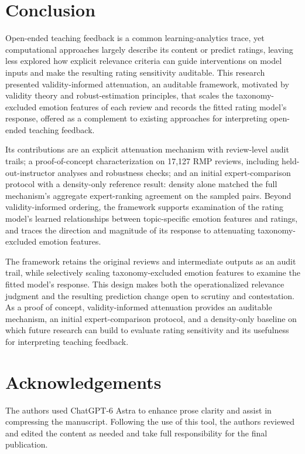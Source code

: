 \documentclass[fleqn,10pt]{JLA_article}
\begin{document}
\section{Conclusion}
Open-ended teaching feedback is a common learning-analytics trace, yet
computational approaches largely describe its content or predict ratings,
leaving less explored how explicit relevance criteria can guide interventions
on model inputs and make the resulting rating sensitivity auditable. This research presented validity-informed
attenuation, an auditable framework, motivated by validity theory and
robust-estimation principles, that scales the taxonomy-excluded emotion
features of each review and records the fitted rating model's response,
offered as a complement to existing approaches for interpreting open-ended
teaching feedback.

Its contributions are an explicit attenuation mechanism with review-level
audit trails; a proof-of-concept characterization on 17{,}127 RMP reviews,
including held-out-instructor analyses and robustness checks; and an initial
expert-comparison protocol with a density-only reference result: density alone
matched the full mechanism's aggregate expert-ranking agreement on the sampled
pairs. Beyond validity-informed ordering, the framework supports examination of the
rating model's learned relationships between topic-specific emotion features
and ratings, and traces the direction and magnitude of its response to
attenuating taxonomy-excluded emotion features.

The framework retains the original reviews and intermediate outputs as an audit trail, while selectively scaling taxonomy-excluded emotion features to examine the fitted model's response. This design makes both the operationalized relevance judgment and the resulting prediction change open to scrutiny and contestation. As a proof of concept, validity-informed attenuation provides an auditable mechanism, an initial expert-comparison protocol, and a density-only baseline on which future research can build to evaluate rating sensitivity and its usefulness for interpreting teaching feedback.
\section*{Acknowledgements}
The authors used ChatGPT-6 Astra to enhance prose clarity and assist in compressing the manuscript. Following the use of this tool, the authors reviewed and edited the content as needed and take full responsibility for the final publication.
\end{document}
